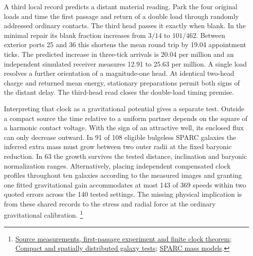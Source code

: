 \documentclass[11pt]{article}
\begin{document}
A third local record predicts a distant material reading. Park the four
original loads and time the first passage and return of a double load
through randomly addressed ordinary contacts. The third head passes it
exactly when blank. In the minimal repair its blank fraction increases
from \(3/14\) to \(101/462\). Between exterior ports 25 and 36 this
shortens the mean round trip by 19.04 appointment ticks. The predicted
increase in three-tick arrivals is 20.04 per million and an independent
simulated receiver measures 12.91 to 25.63 per million. A single load
resolves a further orientation of a magnitude-one head. At identical
two-head charge and returned mean energy, stationary preparations permit
both signs of the distant delay. The third-head read closes the
double-load timing premise.

Interpreting that clock as a gravitational potential gives a separate
test. Outside a compact source the time relative to a uniform partner
depends on the square of a harmonic contact voltage. With the sign of
an attractive well, its enclosed flux can only decrease outward.
In 91 of 108 eligible bulgeless SPARC galaxies the inferred extra mass
must grow between two outer radii at the fixed baryonic reduction.
In 63 the growth survives the tested distance, inclination and baryonic
normalization ranges. Alternatively, placing independent compensated
clock profiles throughout ten galaxies according to the measured images
and granting one fitted gravitational gain accommodates at most 143
of 369 speeds within two quoted errors across the 140 tested settings.
The missing physical implication is from these shared records to the
stress and radial force at the ordinary gravitational calibration.%
\footnote{\href{https://github.com/FloatingPragma/observer-patch-holography/blob/main/model/experiments/interval_echo_shell_flux/product_address/green_response/material_recoil/overlap_source/native_boundary/stock/aperture/CLOSED_SOURCE_RESULTS.md}{Source measurements, first-passage experiment and finite clock theorem};
\href{https://github.com/FloatingPragma/observer-patch-holography/blob/main/code/cosmology/paid_trail_bao/PASSAGE_MASS.md}{Compact and spatially distributed galaxy tests};
\href{https://arxiv.org/abs/1606.09251}{SPARC mass models}.}
\end{document}
